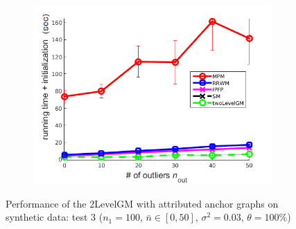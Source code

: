 \begin{figure}[h]
\begin{subfigure}[b]{0.33\textwidth}
			\includegraphics[scale=0.33]{"chapter3/fig/SyntheticTest/descr/Results_v4.3.3/Test1/time_summary_avg10t"} 
		\end{subfigure} 	
	\caption[Performance of the 2LevelGM with attributed anchor graphs on synthetic data (test $3$)]{Performance of the 2LevelGM with attributed anchor graphs on synthetic data: test $3$ ($n_1=100$, $\bar{n}\in[0,50]$, $\sigma^2=0.03$, $\theta=100\%$)}
	\label{fig:synTest3_descr_ver433}
\end{figure}
